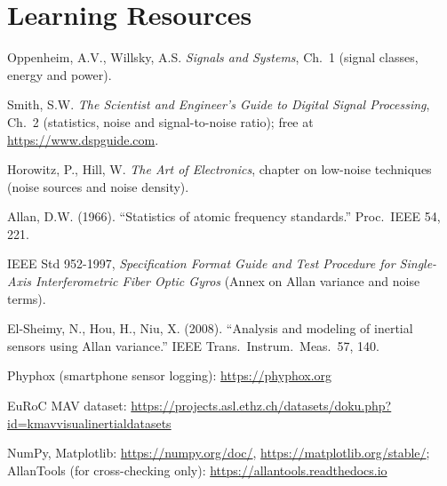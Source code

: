 \documentclass[11pt,a4paper]{article}
\begin{document}
\section*{Learning Resources}
\begin{resources}
  \item Oppenheim, A.V., Willsky, A.S. \emph{Signals and Systems}, Ch.~1 (signal classes, energy and power).
  \item Smith, S.W. \emph{The Scientist and Engineer's Guide to Digital Signal Processing}, Ch.~2 (statistics, noise and signal-to-noise ratio); free at \url{https://www.dspguide.com}.
  \item Horowitz, P., Hill, W. \emph{The Art of Electronics}, chapter on low-noise techniques (noise sources and noise density).
\end{resources}
\begin{resources}
  \item Allan, D.W. (1966). ``Statistics of atomic frequency standards.'' Proc.\ IEEE 54, 221.
  \item IEEE Std 952-1997, \emph{Specification Format Guide and Test Procedure for Single-Axis Interferometric Fiber Optic Gyros} (Annex on Allan variance and noise terms).
  \item El-Sheimy, N., Hou, H., Niu, X. (2008). ``Analysis and modeling of inertial sensors using Allan variance.'' IEEE Trans.\ Instrum.\ Meas.\ 57, 140.
\end{resources}
\begin{resources}
  \item Phyphox (smartphone sensor logging): \url{https://phyphox.org}
  \item EuRoC MAV dataset: \url{https://projects.asl.ethz.ch/datasets/doku.php?id=kmavvisualinertialdatasets}
  \item NumPy, Matplotlib: \url{https://numpy.org/doc/}, \url{https://matplotlib.org/stable/}; AllanTools (for cross-checking only): \url{https://allantools.readthedocs.io}
\end{resources}

\evaluation
\end{document}
